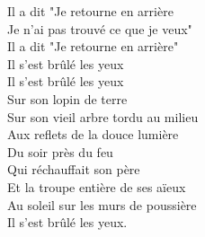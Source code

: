 \documentclass{novel}
\begin{document}
\begin{multicols}{2}
Il a dit "Je retourne en arrière \\
Je n'ai pas trouvé ce que je veux" \\
Il a dit "Je retourne en arrière" \\
Il s'est brûlé les yeux \\
Il s’est brûlé les yeux \\
Sur son lopin de terre \\
Sur son vieil arbre tordu au milieu \\
Aux reflets de la douce lumière \\
Du soir près du feu \\
Qui réchauffait son père \\
Et la troupe entière de ses aïeux \\
Au soleil sur les murs de poussière \\
Il s’est brûlé les yeux. \\
\end{multicols}
\end{document}
